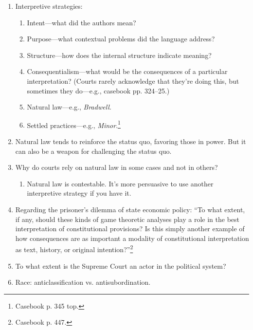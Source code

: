 \begin{enumerate}
    \item Interpretive strategies:
    \begin{enumerate}
        \item Intent---what did the authors mean?
        \item Purpose---what contextual problems did the language address?
        \item Structure---how does the internal structure indicate meaning?
        \item Consequentialism---what would be the consequences of a 
        particular interpretation? (Courts rarely acknowledge that they're 
        doing this, but sometimes they do---e.g., casebook pp. 324--25.)
        \item Natural law---e.g., \emph{Bradwell}.
        \item Settled practices---e.g., \emph{Minor}.\footnote{Casebook p. 345 
        top.}
    \end{enumerate}
    \item Natural law tends to reinforce the status quo, favoring those in 
    power. But it can also be a weapon for challenging the status quo.
    \item Why do courts rely on natural law in some cases and not in others?
    \begin{enumerate}
        \item Natural law is contestable. It's more persuasive to use another 
        interpretive strategy if you have it.
    \end{enumerate}
    \item Regarding the prisoner's dilemma of state economic policy: ``To what 
    extent, if any, should these kinds of game theoretic analyses play a role 
    in the best interpretation of constitutional provisions? Is this simply 
    another example of how consequences are as important a modality of 
    constitutional interpretation as text, history, or original 
    intention?''\footnote{Casebook p. 447.}
    \item To what extent is the Supreme Court an actor in the political 
    system?
    \item Race: anticlassification vs. antisubordination.
\end{enumerate}

